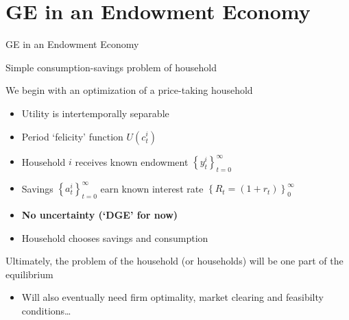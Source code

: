 \section{GE in an Endowment Economy}

\begin{frame}

\begin{center}
{\LARGE GE in an Endowment Economy}
\end{center}

\end{frame}


\begin{frame}{Simple consumption-savings problem of household}

We begin with an optimization of a price-taking household
\begin{itemize}
\item Utility is intertemporally separable
\item Period `felicity' function $U(c_{t}^{i})$
\item Household $i$ receives known endowment $\left\{ y_{t}^{i}\right\}_{t=0}^{\infty }$
\item Savings $\left\{ a_{t}^{i}\right\}_{t=0}^{\infty }$ earn known interest rate $\left\{ R_{t}=(1+r_{t})\right\} _{0}^{\infty }$
\item \textbf{No uncertainty (`DGE' for now)}
\item Household chooses savings and consumption
\end{itemize}

\vspace{2mm}
Ultimately, the problem of the household (or households) will be one part of the equilibrium
\begin{itemize}
\item	Will also eventually need firm optimality, market clearing and feasibilty conditions\ldots
\end{itemize}
\end{frame}


